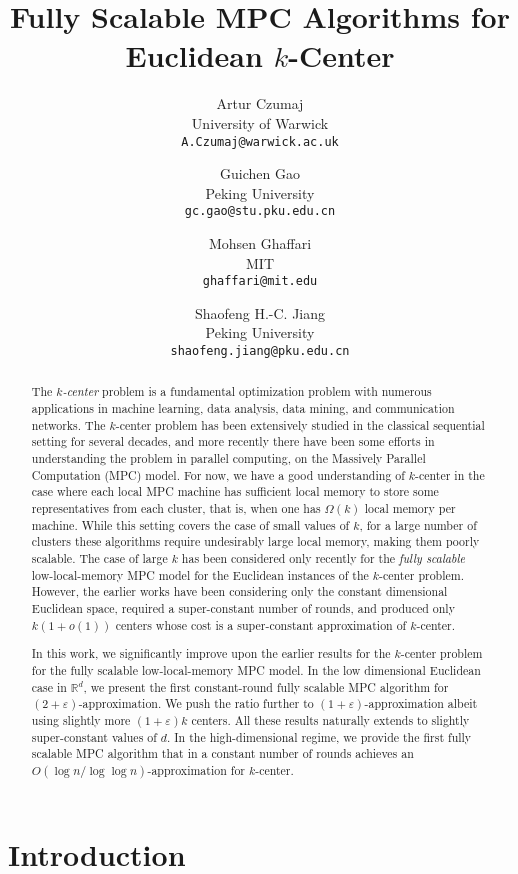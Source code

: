 \documentclass[11pt,letterpaper]{article}
\title{Fully Scalable MPC Algorithms for Euclidean $k$-Center}
\author{
  Artur Czumaj\\
  University of Warwick\\
  \texttt{A.Czumaj@warwick.ac.uk}
  \and 
  Guichen Gao\\
  Peking University\\
  \texttt{gc.gao@stu.pku.edu.cn}
  \and 
  Mohsen Ghaffari\\
  MIT\\
  \texttt{ghaffari@mit.edu}
  \and 
  Shaofeng H.-C. Jiang\\
  Peking University\\
  \texttt{shaofeng.jiang@pku.edu.cn}
 }
\theoremstyle{plain}
\theoremstyle{definition}
\theoremstyle{remark}
\renewcommand{\epsilon}{\ensuremath{\varepsilon}}
\let\epsilon\varepsilon
\begin{document}

\maketitle
\begin{abstract}
The \emph{$k$-center} problem is a fundamental optimization problem with numerous applications in machine learning, data analysis, data mining, and communication networks. The $k$-center problem has been extensively studied in the classical sequential setting for several decades, and more recently there have been some efforts in understanding the problem in parallel computing, on the Massively Parallel Computation (MPC) model. For now, we have a good understanding of $k$-center in the case where each local MPC machine has sufficient local memory to store some representatives from each cluster, that is, when one has $\Omega(k)$
local memory per machine. While this setting covers the case of small values of $k$, for a large number of clusters these algorithms require undesirably large local memory, making them poorly scalable. The case of large $k$ has been considered only recently for the \emph{fully scalable} low-local-memory MPC model for the Euclidean instances of the $k$-center problem. However, the earlier works have been considering only the constant dimensional Euclidean space, required a super-constant number of rounds, and produced only $k(1+o(1))$ centers whose cost is a super-constant approximation of $k$-center.

In this work, we significantly improve upon the earlier results for the $k$-center problem for the fully scalable low-local-memory MPC model. In the low dimensional Euclidean case in $\mathbb{R}^d$, we present the first constant-round fully scalable MPC algorithm for $(2+\varepsilon)$-approximation.
We push the ratio further to $(1 + \epsilon)$-approximation albeit using slightly more $(1 + \varepsilon)k$ centers.
All these results naturally extends to slightly super-constant values of $d$.
In the high-dimensional regime, we provide the first fully scalable MPC algorithm that in a constant number of rounds achieves an $O(\log n/ \log \log n)$-approximation for $k$-center.

\end{abstract}
 
\section{Introduction}
\label{sec:intro}
\end{document}
